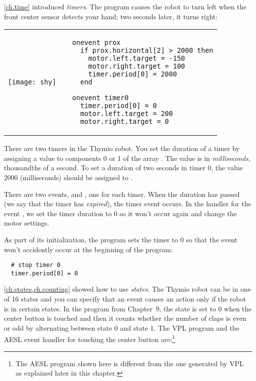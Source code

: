 
\cref{ch.time} introduced \emph{timers}. The program
 causes the robot to turn left when the front center sensor
detects your hand; two seconds later, it turns right:

\begin{center}
\begin{tabular}{ll}
\texttt{[image: shy]} &
\begin{minipage}[b]{.5\textwidth}
\begin{footnotesize}
\begin{verbatim}
  onevent prox
    if prox.horizontal[2] > 2000 then
      motor.left.target = -150
      motor.right.target = 100
      timer.period[0] = 2000
    end
  
  onevent timer0
    timer.period[0] = 0
    motor.left.target = 200
    motor.right.target = 0
\end{verbatim}
\end{footnotesize}
\end{minipage}
\end{tabular}
\end{center}

There are two timers in the Thymio robot. You set the duration of a
timer by assigning a value to components 0 or 1 of the array
. The value is in \emph{milliseconds}, thousandths of a
second. To set a duration of two seconds in timer 0, the value 2000
(milliseconds) should be assigned to .

There are two events,  and , one for each timer.
When the duration has passed (we say that the timer has \emph{expired}),
the timer event occurs. In the handler for the event , we set
the timer duration to 0 so it won't occur again and change the motor
settings.

As part of its initialization, the program sets the timer to 0 so that
the event won't accidently occur at the beginning of the program:

\begin{footnotesize}
\begin{verbatim}
  # stop timer 0
  timer.period[0] = 0
\end{verbatim}
\end{footnotesize}



\cref{ch.states,ch.counting} showed how to use \emph{states}. The
Thymio robot can be in one of 16 states and you can specify that an
event causes an action only if the robot is in certain states. In the
program  from Chapter~9, the state is set to 0 when
the center button is touched and then it counts whether the number of
claps is even or odd by alternating between state 0 and state 1. The VPL
program and the AESL event handler for touching the center button
are:\footnote{The AESL program shown here is different from the one
generated by VPL as explained later in this chapter.}


